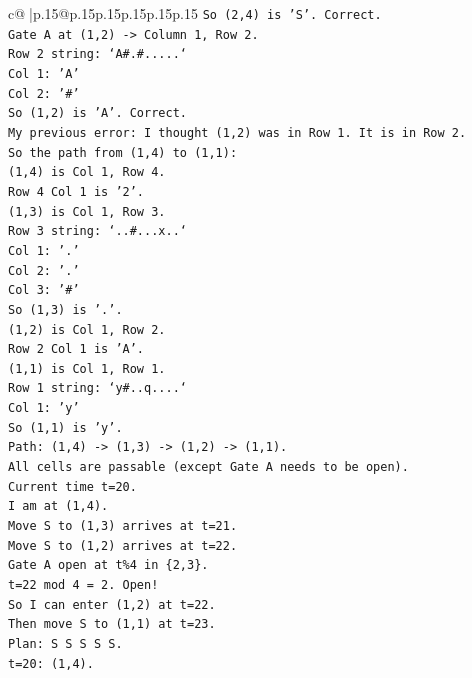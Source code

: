 \documentclass{article}
\begin{document}
{\begin{supertabular}{c@{$\;$}|p{.15\linewidth}@{}p{.15\linewidth}p{.15\linewidth}p{.15\linewidth}p{.15\linewidth}p{.15\linewidth}}
{{{\texttt{So (2,4) is 'S'. Correct.} \\
\texttt{Gate A at (1,2) {-}> Column 1, Row 2.} \\
\texttt{Row 2 string: `A\#.\#.....`} \\
\texttt{Col 1: 'A'} \\
\texttt{Col 2: '\#'} \\
\texttt{So (1,2) is 'A'. Correct.} \\
\texttt{My previous error: I thought (1,2) was in Row 1. It is in Row 2.} \\
\texttt{So the path from (1,4) to (1,1):} \\
\texttt{(1,4) is Col 1, Row 4.} \\
\texttt{Row 4 Col 1 is '2'.} \\
\texttt{(1,3) is Col 1, Row 3.} \\
\texttt{Row 3 string: `..\#...x..`} \\
\texttt{Col 1: '.'} \\
\texttt{Col 2: '.'} \\
\texttt{Col 3: '\#'} \\
\texttt{So (1,3) is '.'.} \\
\texttt{(1,2) is Col 1, Row 2.} \\
\texttt{Row 2 Col 1 is 'A'.} \\
\texttt{(1,1) is Col 1, Row 1.} \\
\texttt{Row 1 string: `y\#..q....`} \\
\texttt{Col 1: 'y'} \\
\texttt{So (1,1) is 'y'.} \\
\texttt{Path: (1,4) {-}> (1,3) {-}> (1,2) {-}> (1,1).} \\
\texttt{All cells are passable (except Gate A needs to be open).} \\
\texttt{Current time t=20.} \\
\texttt{I am at (1,4).} \\
\texttt{Move S to (1,3) arrives at t=21.} \\
\texttt{Move S to (1,2) arrives at t=22.} \\
\texttt{Gate A open at t\%4 in \{2,3\}.} \\
\texttt{t=22 mod 4 = 2. Open!} \\
\texttt{So I can enter (1,2) at t=22.} \\
\texttt{Then move S to (1,1) at t=23.} \\
\texttt{Plan: S S S S S.} \\
\texttt{t=20: (1,4).} \\
}}}
\end{supertabular}}
\end{document}
